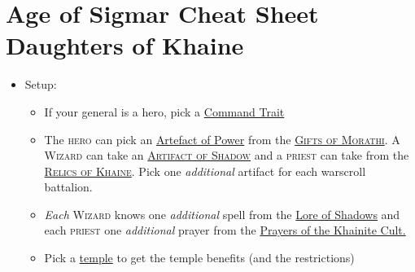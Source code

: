 \section{Age of Sigmar Cheat Sheet\\ \Large{Daughters of Khaine}}

\begin{itemize}
\item Setup: 
    \begin{itemize}
        \item If your general is a hero, pick
            a \hyperref[command-traits]{Command Trait}
        \item The \textsc{hero} can pick an
            \hyperref[artefacts-of-power]{Artefact of Power} from the
            \hyperref[gifts-of-morathi]{\textsc{Gifts of Morathi}}.
            A \textsc{Wizard} can take an
            \hyperref[artifact-of-shadows]{\textsc{Artifact of Shadow}} and
            a \textsc{priest} can take from the
            \hyperref[relics-of-khaine]{\textsc{Relics of Khaine}}. Pick one
            \emph{additional} artifact for each warscroll battalion.
        \item \emph{Each} \textsc{Wizard} knows one \emph{additional} spell
            from the \hyperref[lore-of-shadows]{Lore of Shadows} and each
            \textsc{priest} one \emph{additional} prayer from the
            \hyperref[prayers-of-the-khainite-cult]{Prayers of the Khainite
            Cult.}
        \item Pick a \hyperref[temple]{temple} to get the temple benefits (and
            the restrictions)
    \end{itemize}


\end{itemize}
